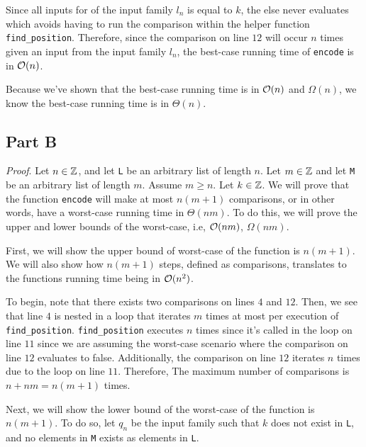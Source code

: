 \documentclass{article}
\begin{document}
Since all inputs for of the input family $l_n$ is equal to $k$, the else never evaluates which avoids having to run the comparison within the helper function \verb|find_position|. Therefore, since the comparison on line $12$ will occur $n$ times given an input from the input family $l_n$, the best-case running time of \verb|encode| is in $\mathcal O (n)$.

\medskip

Because we've shown that the best-case running time is in $\mathcal O(n)$ and $\Omega(n)$, we know the best-case running time is in $\Theta(n)$.


\pagebreak
\subsection*{Part B}

\textit{Proof}. Let $n \in \mathbb Z$, and let \verb|L| be an arbitrary list of length $n$. Let $m \in \mathbb Z$ and let \verb|M| be an arbitrary list of length $m$. Assume $m \geq n$. Let $k \in \mathbb Z$. We will prove that the function \verb|encode| will make at most $n(m+1)$ comparisons, or in other words, have a worst-case running time in $\Theta(nm)$. To do this, we will prove the upper and lower bounds of the worst-case, i.e, $\mathcal O(nm)$, $\Omega(nm)$.

\medskip

First, we will show the upper bound of worst-case of the function is $n(m+1)$. We will also show how $n(m+1)$ steps, defined as comparisons, translates to the functions running time being in $\mathcal O(n^2)$.

To begin, note that there exists two comparisons on lines $4$ and $12$. Then, we see that line $4$ is nested in a loop that iterates $m$ times at most per execution of \verb|find_position|. \verb|find_position| executes $n$ times since it's called in the loop on line $11$ since we are assuming the worst-case scenario where the comparison on line $12$ evaluates to false. Additionally, the comparison on line $12$ iterates $n$ times due to the loop on line $11$. Therefore, The maximum number of comparisons is $n + nm = n(m + 1)$ times.

\medskip

Next, we will show the lower bound of the worst-case of the function is $n(m + 1)$. To do so, let $q_n$ be the input family such that $k$ does not exist in \verb|L|, and no elements in \verb|M| exists as elements in \verb|L|.
\end{document}
